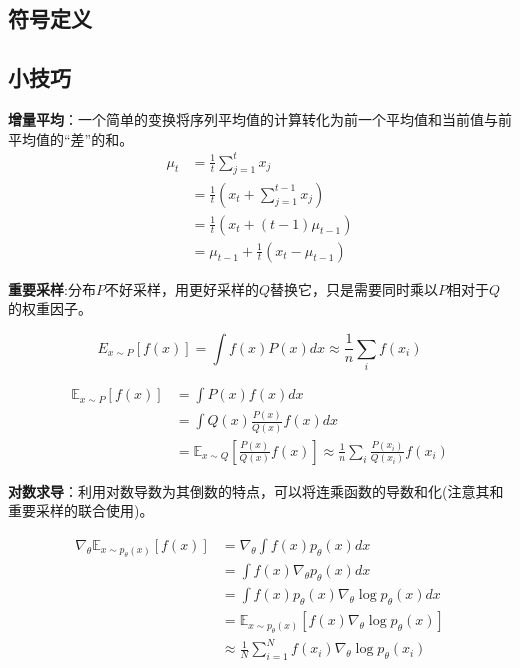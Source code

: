 \documentclass[UTF8]{ctexart}
\begin{document}
\subsection{符号定义}
\subsection{小技巧}
\label{sub:smalltricks}
\textbf{增量平均}：一个简单的变换将序列平均值的计算转化为前一个平均值和当前值与前平均值的“差”的和。
\begin{equation} \label{Incremental:Mean}
    \begin{aligned}
    \mu_{t} &=\frac{1}{t} \sum_{j=1}^{t} x_{j} \\
    &=\frac{1}{t}\left(x_{t}+\sum_{j=1}^{t-1} x_{j}\right) \\
    &=\frac{1}{t}\left(x_{t}+(t-1) \mu_{t-1}\right) \\
    &=\mu_{t-1}+\frac{1}{t}\left(x_{t}-\mu_{t-1}\right)
    \end{aligned} 
\end{equation}



\textbf{重要采样}:分布$P$不好采样，用更好采样的$Q$替换它，只是需要同时乘以$P$相对于$Q$的权重因子。

\[
E_{x \sim P}[f(x)]=\int f(x) P(x) d x \approx \frac{1}{n} \sum_{i} f\left(x_{i}\right) \label{Important:Sample}
\]

\[
\begin{aligned}
\mathbb{E}_{x \sim P}[f(x)] &=\int P(x) f(x) d x \\
&=\int Q(x) \frac{P(x)}{Q(x)} f(x) d x \\
&=\mathbb{E}_{x \sim Q}\left[\frac{P(x)}{Q(x)} f(x)\right] \approx \frac{1}{n} \sum_{i} \frac{P\left(x_{i}\right)}{Q\left(x_{i}\right)} f\left(x_{i}\right)
\end{aligned}
\]

\textbf{对数求导}：利用对数导数为其倒数的特点，可以将连乘函数的导数和化(注意其和重要采样的联合使用)。

\[
\begin{aligned}
\nabla_{\theta} \mathbb{E}_{x \sim p_{\theta}(x)}[f(x)] &=\nabla_{\theta} \int f(x) p_{\theta}(x) d x \\
&=\int f(x) \nabla_{\theta} p_{\theta}(x) d x \\
&=\int f(x) p_{\theta}(x) \nabla_{\theta} \log p_{\theta}(x) d x \\
&=\mathbb{E}_{x \sim p_{\theta}(x)}\left[f(x) \nabla_{\theta} \log p_{\theta}(x)\right] \\
& \approx \frac{1}{N} \sum_{i=1}^{N} f\left(x_{i}\right) \nabla_{\theta} \log p_{\theta}\left(x_{i}\right)
\end{aligned}
\]
\end{document}
